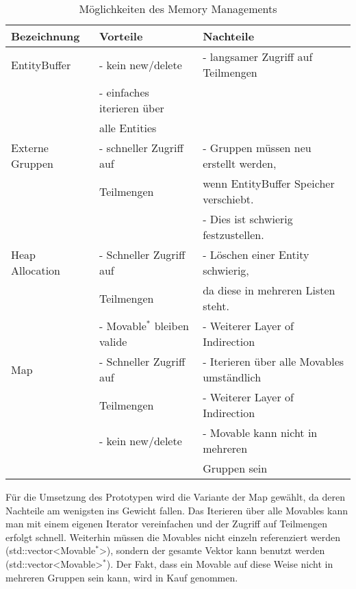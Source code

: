 \documentclass[11pt,a4paper]{article}
\begin{document}
\begin{center}
\begin{table}[!ht]
\begin{tabular}{l | l | l}
\textbf{Bezeichnung} & \textbf{Vorteile} & \textbf{Nachteile}\\
\hline
EntityBuffer & - kein new/delete & - langsamer Zugriff auf Teilmengen \\
& - einfaches iterieren über\\
& \hspace{4pt} alle Entities\\
 \hline
Externe Gruppen & - schneller Zugriff auf & - Gruppen müssen neu erstellt werden, \\
& \hspace{4pt} Teilmengen &\hspace{4pt}  wenn EntityBuffer Speicher verschiebt. \\
& & - Dies ist schwierig festzustellen. \\
\hline
Heap Allocation & - Schneller Zugriff auf & - Löschen einer Entity schwierig, \\
& \hspace{4pt} Teilmengen & \hspace{4pt} da diese in mehreren Listen steht. \\
& - Movable$^\ast$ bleiben valide & - Weiterer Layer of Indirection\\
\hline
Map & - Schneller Zugriff auf & - Iterieren über alle Movables umständlich \\
& \hspace{4pt} Teilmengen & - Weiterer Layer of Indirection\\
& - kein new/delete& - Movable kann nicht in mehreren \\
& & \hspace{4pt} Gruppen sein \\
\end{tabular}
\captionsetup{justification=centering}
\caption[Möglichkeiten des Memory Managements]{Möglichkeiten des Memory Managements}
\label{tab:MemoryManagement}
\end{table}
\end{center}
\normalsize
Für die Umsetzung des Prototypen wird die Variante der Map gewählt, da deren Nachteile am wenigsten ins Gewicht fallen. Das Iterieren über alle Movables kann man mit einem eigenen Iterator vereinfachen und der Zugriff auf Teilmengen erfolgt schnell. Weiterhin müssen die Movables nicht einzeln referenziert werden (std::vector\textless Movable$^\ast$\textgreater), sondern der gesamte Vektor kann benutzt werden (std::vector\textless Movable\textgreater$^\ast$). Der Fakt, dass ein Movable auf diese Weise nicht in mehreren Gruppen sein kann, wird in Kauf genommen.
\end{document}
